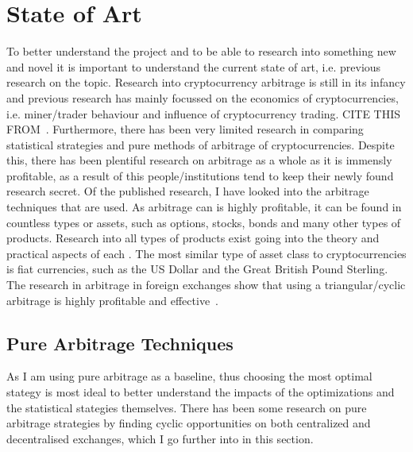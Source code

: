 \section{State of Art}
To better understand the project and to be able to research into something new and novel it is important to understand the current state of art, i.e. previous research on the topic. Research into cryptocurrency arbitrage is still in its infancy and previous research has mainly focussed on the economics of cryptocurrencies, i.e. miner/trader behaviour and influence of cryptocurrency trading. CITE THIS FROM~\cite{wang_cyclic_2022}. Furthermore, there has been very limited research in comparing statistical strategies and pure methods of arbitrage of cryptocurrencies. Despite this, there has been plentiful research on arbitrage as a whole as it is immensly profitable, as a result of this people/institutions tend to keep their newly found research secret. Of the published research, I have looked into the arbitrage techniques that are used. As arbitrage can is highly profitable, it can be found in countless types or assets, such as options, stocks, bonds and many other types of products. Research into all types of products exist going into the theory and practical aspects of each \cite{mo_theoretical_nodate, 8957853}. The most similar type of asset class to cryptocurrencies is fiat currencies, such as the US Dollar and the Great British Pound Sterling. The research in arbitrage in foreign exchanges show that using a triangular/cyclic arbitrage is highly profitable and effective~\cite{akram2008arbitrage, aiba2002triangular, ito2012free}. 

\subsection{Pure Arbitrage Techniques}
As I am using pure arbitrage as a baseline, thus choosing the most optimal stategy is most ideal to better understand the impacts of the optimizations and the statistical stategies themselves. There has been some research on pure arbitrage strategies by finding cyclic opportunities on both centralized and decentralised exchanges, which I go further into in this section.

